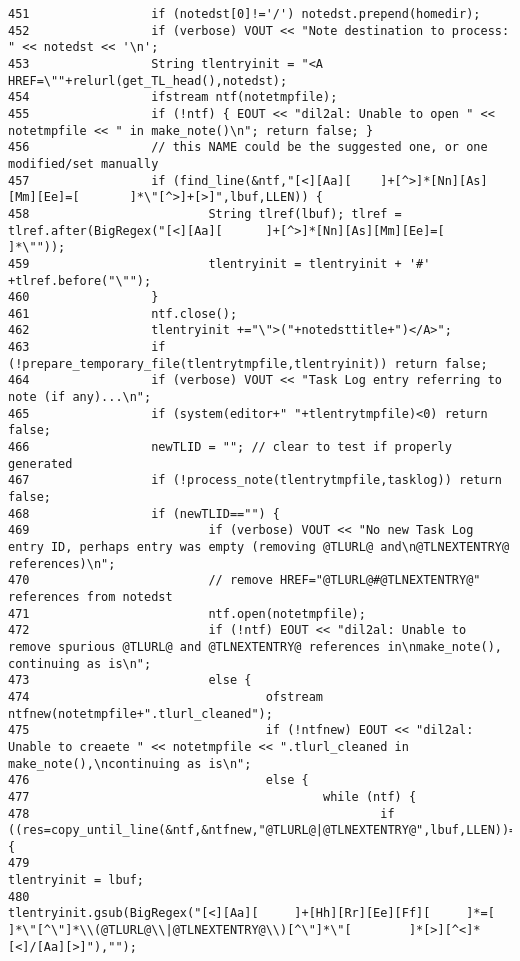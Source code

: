 \begin{verbatim}
451                 if (notedst[0]!='/') notedst.prepend(homedir);
452                 if (verbose) VOUT << "Note destination to process: " << notedst << '\n';
453                 String tlentryinit = "<A HREF=\""+relurl(get_TL_head(),notedst);
454                 ifstream ntf(notetmpfile);
455                 if (!ntf) { EOUT << "dil2al: Unable to open " << notetmpfile << " in make_note()\n"; return false; }
456                 // this NAME could be the suggested one, or one modified/set manually
457                 if (find_line(&ntf,"[<][Aa][    ]+[^>]*[Nn][As][Mm][Ee]=[       ]*\"[^>]+[>]",lbuf,LLEN)) {
458                         String tlref(lbuf); tlref = tlref.after(BigRegex("[<][Aa][      ]+[^>]*[Nn][As][Mm][Ee]=[       ]*\""));
459                         tlentryinit = tlentryinit + '#' +tlref.before("\"");
460                 }
461                 ntf.close();
462                 tlentryinit +="\">("+notedsttitle+")</A>";
463                 if (!prepare_temporary_file(tlentrytmpfile,tlentryinit)) return false;
464                 if (verbose) VOUT << "Task Log entry referring to note (if any)...\n";
465                 if (system(editor+" "+tlentrytmpfile)<0) return false;
466                 newTLID = ""; // clear to test if properly generated
467                 if (!process_note(tlentrytmpfile,tasklog)) return false;
468                 if (newTLID=="") {
469                         if (verbose) VOUT << "No new Task Log entry ID, perhaps entry was empty (removing @TLURL@ and\n@TLNEXTENTRY@ references)\n";
470                         // remove HREF="@TLURL@#@TLNEXTENTRY@" references from notedst
471                         ntf.open(notetmpfile);
472                         if (!ntf) EOUT << "dil2al: Unable to remove spurious @TLURL@ and @TLNEXTENTRY@ references in\nmake_note(), continuing as is\n";
473                         else {
474                                 ofstream ntfnew(notetmpfile+".tlurl_cleaned");
475                                 if (!ntfnew) EOUT << "dil2al: Unable to creaete " << notetmpfile << ".tlurl_cleaned in make_note(),\ncontinuing as is\n";
476                                 else {
477                                         while (ntf) {
478                                                 if ((res=copy_until_line(&ntf,&ntfnew,"@TLURL@|@TLNEXTENTRY@",lbuf,LLEN))==1) {
479                                                         tlentryinit = lbuf;
480                                                         tlentryinit.gsub(BigRegex("[<][Aa][     ]+[Hh][Rr][Ee][Ff][     ]*=[    ]*\"[^\"]*\\(@TLURL@\\|@TLNEXTENTRY@\\)[^\"]*\"[        ]*[>][^<]*[<]/[Aa][>]"),"");

\end{verbatim}
